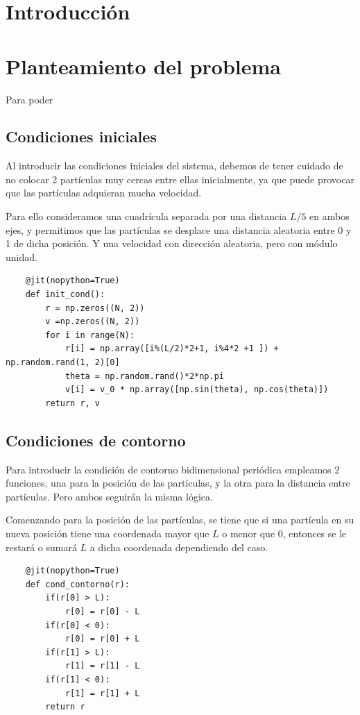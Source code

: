 \documentclass[11pt, twoside]{article} %
\begin{document}
\pagestyle{main}

\section{Introducción}

\section{Planteamiento del problema}

Para poder 

\subsection{Condiciones iniciales}
Al introducir las condiciones iniciales del sistema, debemos de tener cuidado de
no colocar 2 partículas muy cercas entre ellas inicialmente, ya que puede provocar
que las partículas adquieran mucha velocidad. 

Para ello consideramos una cuadrícula separada por una distancia $L/5$ en ambos 
ejes, y permitimos que las partículas se desplace una distancia aleatoria entre 0 y 1
de dicha posición. Y una velocidad con dirección aleatoria, pero con módulo unidad.

\begin{verbatim}
    @jit(nopython=True)
    def init_cond():
        r = np.zeros((N, 2))
        v =np.zeros((N, 2))
        for i in range(N):
            r[i] = np.array([i%(L/2)*2+1, i%4*2 +1 ]) + np.random.rand(1, 2)[0]
            theta = np.random.rand()*2*np.pi
            v[i] = v_0 * np.array([np.sin(theta), np.cos(theta)])
        return r, v
\end{verbatim}

\subsection{Condiciones de contorno}

Para introducir la condición de contorno bidimensional periódica empleamos 
2 funciones, una para la posición de las partículas, y la otra para la 
distancia entre partículas. Pero ambos seguirán la misma lógica.

Comenzando para la posición de las partículas, se tiene que si una partícula en su
nueva posición tiene una coordenada mayor que $L$ o menor que 0, entonces se le 
restará o sumará $L$ a dicha coordenada dependiendo del caso. 

\begin{verbatim}
    @jit(nopython=True)
    def cond_contorno(r):
        if(r[0] > L):
            r[0] = r[0] - L
        if(r[0] < 0):
            r[0] = r[0] + L
        if(r[1] > L):
            r[1] = r[1] - L
        if(r[1] < 0):
            r[1] = r[1] + L
        return r
\end{verbatim}
\end{document}
